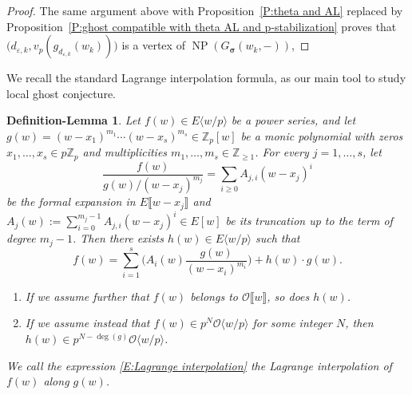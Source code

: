 \documentclass[12pt]{amsart}
\newtheorem{definition-lemma}[subsection]{Definition-Lemma}
\theoremstyle{definition}
\newtheorem{remark}[subsection]{Remark}
\numberwithin{equation}{subsection}
\def\calO{\mathcal{O}}
\def\ZZ{\mathbb{Z}}
\def\rmH{\mathrm{H}}
\def\rmS{\mathrm{S}}
\newcommand{\Proj}{\mathrm{Proj}}
\DeclareMathOperator{\NP}{NP}
\newcommand{\bbsigma}{\boldsymbol{\sigma}}
\newcommand{\Iw}{\mathrm{Iw}}
\newcommand{\Matrix}[4]{{\big(\begin{smallmatrix}#1&#2\\#3& #4\end{smallmatrix} \big)}}
\begin{document}
\begin{proof}
The same argument above with Proposition~\ref{P:theta and AL} replaced by Proposition~\ref{P:ghost compatible with theta AL and p-stabilization} proves that $\big(d_{\varepsilon, k}, v_p(g_{d_{\varepsilon,k}}(w_k))\big)$ is a vertex of $\NP(G_{\bbsigma}(w_k,-))$, 
\end{proof}

We recall the standard Lagrange interpolation formula, as our main tool to study local ghost conjecture.
\begin{definition-lemma}
\label{DL:interpolation formula for simple roots}
Let $f(w)\in E\langle w/p\rangle$ be a power series, and let $g(w) = (w-x_1)^{m_1}\cdots (w-x_s)^{m_s} \in \ZZ_p[w]$ be a monic polynomial with zeros $x_1,\dots, x_s\in p\ZZ_p$ and multiplicities $m_1, \dots, m_s \in \ZZ_{\geq 1}$. For every $j=1,\dots, s$, let 
\[
\frac{f(w)}{g(w)/(w-x_j)^{m_j}}=\sum_{i\geq 0} A_{j,i}(w-x_j)^i
\]
be the formal expansion in $E\llbracket w-x_j\rrbracket$ and $A_j(w):=\sum\limits_{i=0}^{m_j-1}A_{j,i}(w-x_j)^i\in E[w]$ be its truncation up to the term of degree $m_j-1$. Then there exists $h(w)\in E\langle w/p \rangle$ such that
\begin{equation}
\label{E:Lagrange interpolation}
f(w) = \sum_{i=1}^s \Big(A_i(w) \frac{g(w)}{(w-x_i)^{m_i}} \Big) + h(w) \cdot g(w).
\end{equation}
\begin{enumerate}
\item If we assume further that $f(w)$ belongs to $\calO\llbracket w\rrbracket$, so does $h(w)$. 
\item If we assume instead that $f(w) \in p^N\calO\langle w/p\rangle$ for some integer $N$, then $h(w) \in p^{N-\deg(g)}\calO\langle w/p\rangle$.
\end{enumerate}


We call the expression \eqref{E:Lagrange interpolation} the \emph{Lagrange interpolation of $f(w)$ along $g(w)$}.
\end{definition-lemma}
\end{document}
